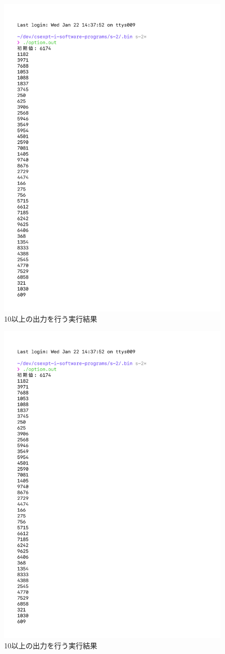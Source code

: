 \begin{figure}[H]
    \ContinuedFloat
    \centering
    \includegraphics[width=0.8\hsize, pagebox=mediabox, page=2]{option_result_img.pdf}
    \caption{10以上の出力を行う実行結果}
    \label{10以上の出力を行う実行結果}
\end{figure}
\begin{figure}[H]
    \ContinuedFloat
    \centering
    \includegraphics[width=0.8\hsize, pagebox=mediabox, page=3]{option_result_img.pdf}
    \caption{10以上の出力を行う実行結果}
    \label{10以上の出力を行う実行結果}
\end{figure}

